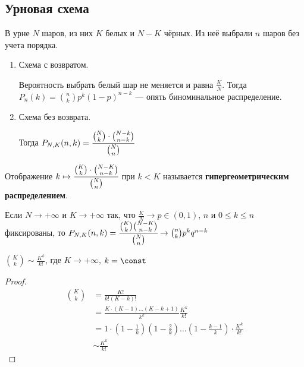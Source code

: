 \documentclass[12pt, a4paper, oneside]{book}
\begin{document}
\subsection{Урновая схема}

В урне \(N\) шаров, из них \(K\) белых и \(N - K\) чёрных. Из неё выбрали \(n\) шаров без учета порядка.

\begin{enumerate}
    \item Схема с возвратом.

          Вероятность выбрать белый шар не меняется и равна \(\frac{K}{N}\). Тогда \(P_n(k) = \binom{n}{k}p^k(1 - p)^{n - k}\) --- опять биноминальное распределение.

    \item Схема без возврата.

          Тогда \(P_{N,K}(n, k) = \cfrac{\binom{N}{k} \cdot \binom{N - k}{n - k}}{\binom{N}{n}} \)
\end{enumerate}

\begin{definition}
    Отображение \(k \mapsto \cfrac{\binom{K}{k}\cdot \binom{N - K}{n - k}}{\binom{N}{n}}\) при \(k < K\) называется \textbf{гипергеометрическим распределением}.
\end{definition}

\begin{theorem}
    Если \(N \to +\infty\) и \(K \to +\infty\) так, что \(\frac{K}{N} \to p\in(0,1)\), \(n\) и \(0 \leq k \leq n\) фиксированы, то \(P_{N,K}(n,k) = \cfrac{\binom{K}{k}\binom{N - K}{n - k}}{\binom{N}{n}} \to \binom{n}{k}p^k q^{n - k}\)

    \label{урна бином}
\end{theorem}

\begin{lemma}
    \(\binom{K}{k} \sim \frac{K^k}{k!} \), где \(K \to +\infty\), \(k = \const\)
\end{lemma}
\begin{proof}
    \begin{align*}
        \binom{K}{k} & = \frac{K!}{k!(K - k)!}                                                                                                             \\
                     & = \frac{K\cdot(K - 1)\dots (K - k + 1)}{k^k}\frac{K^k}{k!}                                                                          \\
                     & = 1\cdot \left( 1 - \frac{1}{k} \right)\left( 1 - \frac{2}{k} \right) \dots \left( 1 - \frac{k - 1}{k} \right) \cdot \frac{K^k}{k!} \\
                     & \sim \frac{K^k}{k!}
    \end{align*}
\end{proof}
\end{document}
